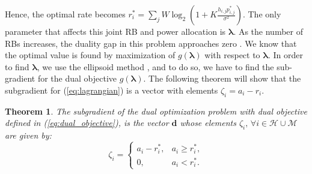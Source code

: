 \documentclass[journal,draftclsnofoot,onecolumn,12pt]{IEEEtran}%
\newtheorem{theorem}{\bf Theorem}
\newcommand{\lambdab}{\boldsymbol{\lambda}}
\begin{document}
Hence, the optimal rate becomes $r^*_i= \sum_j W \log_2(1+K \frac{h_{i,j}p^*_{i,j}}{\sigma^2})$. The only parameter that affects this joint RB and power allocation is $\lambdab$. As the number of RBs increases, the duality gap in this problem approaches zero \cite{seong2006optimal}. We know that the optimal value is found by maximization of $g(\lambdab)$ with respect to $\lambdab$. In order to find $\lambdab$,  we use the ellipsoid method \cite{yu2006dual}, and to do so, we have to find the sub-gradient for the dual objective $g(\lambdab)$.  The following theorem will show that the subgradient for (\ref{eq:lagrangian}) is a vector with elements $\zeta_i=a_i-r_i$. 
\begin{theorem}
The subgradient of the dual optimization problem with dual objective defined in (\ref{eq:dual_objective}), is the vector $\boldsymbol d$ whose elements $\zeta_i, \, \forall i \in \mathcal{H} \cup \mathcal{M}$ are given by: 
\begin{equation}
\zeta_i=\begin{cases}
a_i-r_i^*, &a_i \geq r_i^*,\\
0, &a_i<r_i^*.
\end{cases}
\end{equation}
\end{theorem}
\end{document}
